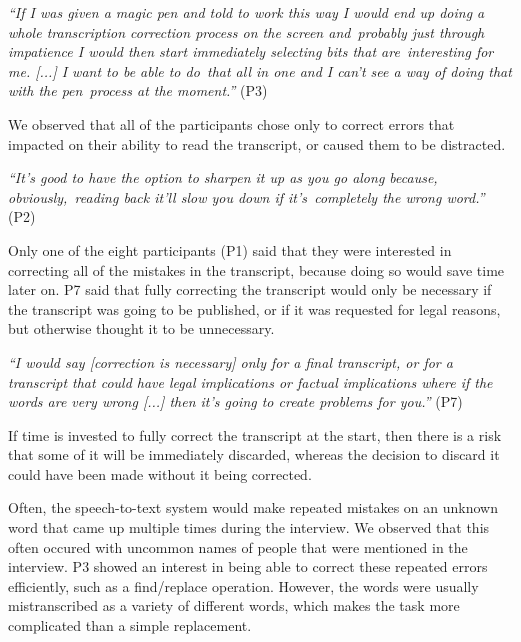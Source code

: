 \textit{``If I was given a magic pen and told to work this way I would end up doing a whole transcription correction
  process on the screen and probably just through impatience I would then start immediately selecting bits that
  are interesting for me. [...] I want to be able to do that all in one and I can't see a way of doing that with the
pen process at the moment.''} (P3)

We observed that all of the participants chose only to correct errors that impacted on their ability to read the
transcript, or caused them to be distracted.

\textit{``It's good to have the option to sharpen it up as you go along because, obviously, reading back it'll slow
you down if it's completely the wrong word.''} (P2)

Only one of the eight participants (P1) said that they were interested in correcting all of the mistakes in the
transcript, because doing so would save time later on.  P7 said that fully correcting the transcript would only be
necessary if the transcript was going to be published, or if it was requested for legal reasons, but otherwise thought
it to be unnecessary.

\textit{``I would say [correction is necessary] only for a final transcript, or for a transcript that could have legal
  implications or factual implications where if the words are very wrong [...]
then it's going to create problems for you.''} (P7)

If time is invested to fully correct the transcript at the start, then there is a risk that some of it will be
immediately discarded, whereas the decision to discard it could have been made without it being corrected.



Often, the speech-to-text system would make repeated mistakes on an unknown word that came up multiple times during the
interview. We observed that this often occured with uncommon names of people that were mentioned in the
interview. P3 showed an interest in being able to correct these repeated errors efficiently, such as a find/replace
operation. However, the words were usually mistranscribed as a variety of different words, which makes the task more
complicated than a simple replacement.


